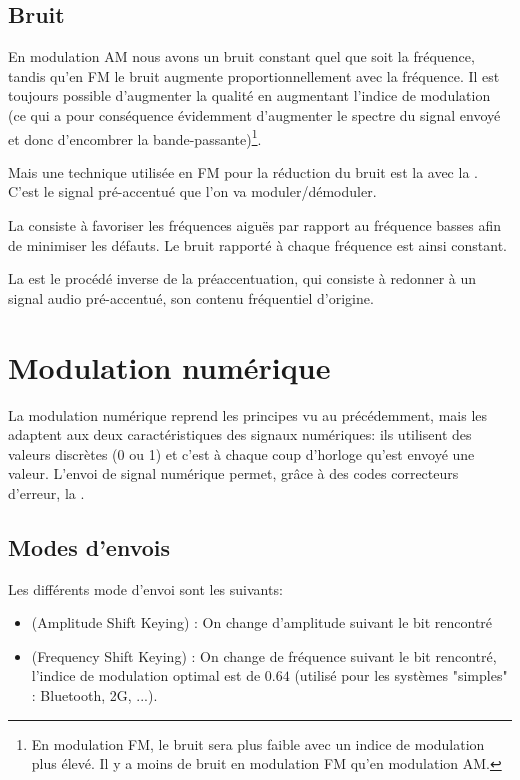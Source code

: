 \subsection{Bruit}

En modulation AM nous avons un bruit constant quel que soit la fréquence, tandis qu'en FM le bruit augmente proportionnellement avec la fréquence. Il est toujours possible d'augmenter la qualité en augmentant l'indice de modulation (ce qui a pour conséquence évidemment d'augmenter le spectre du signal envoyé et donc d'encombrer la bande-passante)\footnote{En modulation FM, le bruit sera plus faible avec un indice de modulation plus élevé. Il y a moins de bruit en modulation FM qu'en modulation AM.}.

Mais une technique utilisée en FM pour la réduction du bruit est la  avec la . C'est le signal pré-accentué que l'on va moduler/démoduler.

La  consiste à favoriser les fréquences aiguës par rapport au fréquence basses afin de minimiser les défauts. Le bruit rapporté à chaque fréquence est ainsi constant.

La  est le procédé inverse de la préaccentuation, qui consiste à redonner à un signal audio pré-accentué, son contenu fréquentiel d'origine.

\section{Modulation numérique}

La modulation numérique reprend les principes vu au précédemment, mais les adaptent aux deux caractéristiques des signaux numériques: ils utilisent des valeurs discrètes (0 ou 1) et c'est à chaque coup d'horloge qu'est envoyé une valeur. L'envoi de signal numérique permet, grâce à des codes correcteurs d'erreur, la .

\subsection{Modes d'envois}

Les différents mode d'envoi sont les suivants:
\begin{itemize}
	\item {} (Amplitude Shift Keying) : On change d'amplitude suivant le bit rencontré
	\item {} (Frequency Shift Keying) : On change de fréquence suivant le bit rencontré, l'indice de modulation optimal est de $0.64$ (utilisé pour les systèmes "simples" : Bluetooth, 2G, ...).
\end{itemize}

